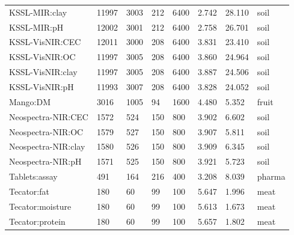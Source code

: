 \begin{tabular}{llllllll}
KSSL-MIR:clay & 11997 & 3003 & 212 & 6400 & 2.742 & 28.110 & soil \\
KSSL-MIR:pH & 12002 & 3001 & 212 & 6400 & 2.758 & 26.701 & soil \\
KSSL-VisNIR:CEC & 12011 & 3000 & 208 & 6400 & 3.831 & 23.410 & soil \\
KSSL-VisNIR:OC & 11997 & 3005 & 208 & 6400 & 3.860 & 24.964 & soil \\
KSSL-VisNIR:clay & 11997 & 3005 & 208 & 6400 & 3.887 & 24.506 & soil \\
KSSL-VisNIR:pH & 11993 & 3007 & 208 & 6400 & 3.828 & 24.052 & soil \\
Mango:DM & 3016 & 1005 & 94 & 1600 & 4.480 & 5.352 & fruit \\
Neospectra-NIR:CEC & 1572 & 524 & 150 & 800 & 3.902 & 6.602 & soil \\
Neospectra-NIR:OC & 1579 & 527 & 150 & 800 & 3.907 & 5.811 & soil \\
Neospectra-NIR:clay & 1580 & 526 & 150 & 800 & 3.909 & 6.345 & soil \\
Neospectra-NIR:pH & 1571 & 525 & 150 & 800 & 3.921 & 5.723 & soil \\
Tablets:assay & 491 & 164 & 216 & 400 & 3.208 & 8.039 & pharma \\
Tecator:fat & 180 & 60 & 99 & 100 & 5.647 & 1.996 & meat \\
Tecator:moisture & 180 & 60 & 99 & 100 & 5.613 & 1.673 & meat \\
Tecator:protein & 180 & 60 & 99 & 100 & 5.657 & 1.802 & meat \\
\hline
\end{tabular}

